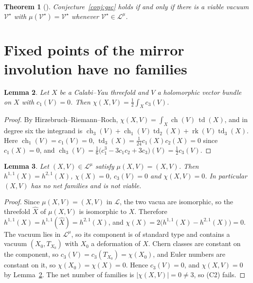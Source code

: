 \documentclass[11pt]{amsart}
\newtheorem{theorem}{Theorem}[section]
\newtheorem{lemma}[theorem]{Lemma}
\theoremstyle{definition}
\theoremstyle{remark}
\newcommand{\cL}{\mathcal{L}}
\newcommand{\cV}{\mathcal{V}}
\begin{document}
\begin{theorem}[{\cite[Theorem~22]{BB26}}]\label{thm:D}
Conjecture~\ref{conj:gsc} holds if and only if there is a viable vacuum
$\cV^\star$ with $\mu(\cV^\star)=\cV^\star$ whenever $\cV^\star\in\cL^\mu$.
\end{theorem}

\section{Fixed points of the mirror involution have no families}\label{sec:proof}

\begin{lemma}\label{lem:index}
Let $X$ be a Calabi--Yau threefold and $V$ a holomorphic vector bundle on $X$
with $c_1(V)=0$. Then $\chi(X,V)=\tfrac12\int_Xc_3(V)$.
\end{lemma}

\begin{proof}
By Hirzebruch--Riemann--Roch, $\chi(X,V)=\int_X\operatorname{ch}(V)\,
\operatorname{td}(X)$, and in degree six the integrand is
$\operatorname{ch}_3(V)+\operatorname{ch}_1(V)\operatorname{td}_2(X)+
\operatorname{rk}(V)\operatorname{td}_3(X)$. Here
$\operatorname{ch}_1(V)=c_1(V)=0$, $\operatorname{td}_3(X)=
\tfrac1{24}c_1(X)c_2(X)=0$ since $c_1(X)=0$, and
$\operatorname{ch}_3(V)=\tfrac16\big(c_1^3-3c_1c_2+3c_3\big)(V)=
\tfrac12c_3(V)$.
\end{proof}

\begin{lemma}\label{lem:fixed}
Let $(X,V)\in\cL^\mu$ satisfy $\mu(X,V)=(X,V)$. Then $h^{1,1}(X)=h^{2,1}(X)$,
$\chi(X)=0$, $c_3(V)=0$ and $\chi(X,V)=0$. In particular $(X,V)$ has no net
families and is not viable.
\end{lemma}

\begin{proof}
Since $\mu(X,V)=(X,V)$ in $\cL$, the two vacua are isomorphic, so the
threefold $\widehat X$ of $\mu(X,V)$ is isomorphic to $X$. Therefore
$h^{1,1}(X)=h^{1,1}(\widehat X)=h^{2,1}(X)$, and
$\chi(X)=2\big(h^{1,1}(X)-h^{2,1}(X)\big)=0$. The vacuum lies in $\cL^\mu$, so
its component is of standard type and contains a vacuum $(X_0,T_{X_0})$ with
$X_0$ a deformation of $X$. Chern classes are constant on the component, so
$c_3(V)=c_3(T_{X_0})=\chi(X_0)$, and Euler numbers are constant on it, so
$\chi(X_0)=\chi(X)=0$. Hence $c_3(V)=0$, and $\chi(X,V)=0$ by
Lemma~\ref{lem:index}. The net number of families is $|\chi(X,V)|=0\ne3$, so
(C2) fails.
\end{proof}
\end{document}
